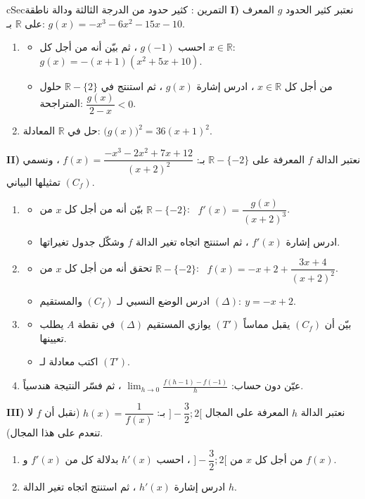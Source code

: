\documentclass[12pt,a4paper]{article}
\newenvironment{BOX}[2]{\begin{otherlanguage}{english}\begin{arbox}{#1}{#2}}{\end{arbox}\end{otherlanguage}}
\newcounter{exo}
\newenvironment{tamrin}[1]{\stepcounter{exo}\begin{BOX}{cSec}{التمرين \theexo: #1}}{\end{BOX}}
\newcommand{\R}{\mathbb{R}}
\newenvironment{sq}{\begin{itemize}[leftmargin=2.4em,itemsep=3pt]}{\end{itemize}}
\newcommand{\qa}{\item[(أ)]}\newcommand{\qb}{\item[(ب)]}\newcommand{\qc}{\item[(جـ)]}\newcommand{\qd}{\item[(د)]}\newcommand{\qe}{\item[(هـ)]}
\begin{document}
\begin{tamrin}{كثير حدود من الدرجة الثالثة ودالة ناطقة}
\textbf{I)} نعتبر كثير الحدود $g$ المعرف على $\R$ بـ: $g(x)=-x^3-6x^2-15x-10$.
\begin{enumerate}
\item
\begin{sq}
\qa احسب $g(-1)$ ، ثم بيّن أنه من أجل كل $x\in\R$: \ $g(x)=-(x+1)(x^2+5x+10)$.
\qb من أجل كل $x\in\R$ ، ادرس إشارة $g(x)$ ، ثم استنتج في $\R-\{2\}$ حلول المتراجحة: $\dfrac{g(x)}{2-x}<0$.
\end{sq}
\item حل في $\R$ المعادلة: $\big(g(x)\big)^2=36(x+1)^2$.
\end{enumerate}
\textbf{II)} نعتبر الدالة $f$ المعرفة على $\R-\{-2\}$ بـ: $f(x)=\dfrac{-x^3-2x^2+7x+12}{(x+2)^2}$ ، ونسمي $(C_f)$ تمثيلها البياني.
\begin{enumerate}
\item
\begin{sq}
\qa بيّن أنه من أجل كل $x$ من $\R-\{-2\}$: \ $f'(x)=\dfrac{g(x)}{(x+2)^3}$.
\qb ادرس إشارة $f'(x)$ ، ثم استنتج اتجاه تغير الدالة $f$ وشكّل جدول تغيراتها.
\end{sq}
\item
\begin{sq}
\qa تحقق أنه من أجل كل $x$ من $\R-\{-2\}$: \ $f(x)=-x+2+\dfrac{3x+4}{(x+2)^2}$.
\qb ادرس الوضع النسبي لـ $(C_f)$ والمستقيم $(\Delta):\ y=-x+2$.
\end{sq}
\item
\begin{sq}
\qa بيّن أن $(C_f)$ يقبل مماساً $(T')$ يوازي المستقيم $(\Delta)$ في نقطة $A$ يطلب تعيينها.
\qb اكتب معادلة لـ $(T')$.
\end{sq}
\item عيّن دون حساب: $\displaystyle\lim_{h\to0}\frac{f(h-1)-f(-1)}{h}$ ، ثم فسّر النتيجة هندسياً.
\end{enumerate}
\textbf{III)} نعتبر الدالة $h$ المعرفة على المجال $\Big]-\dfrac32;2\Big[$ بـ: $h(x)=\dfrac{1}{f(x)}$ (نقبل أن $f$ لا تنعدم على هذا المجال).
\begin{enumerate}
\item من أجل كل $x$ من $\Big]-\dfrac32;2\Big[$ ، احسب $h'(x)$ بدلالة كل من $f'(x)$ و $f(x)$.
\item ادرس إشارة $h'(x)$ ، ثم استنتج اتجاه تغير الدالة $h$.
\end{enumerate}
\end{tamrin}
\end{document}
